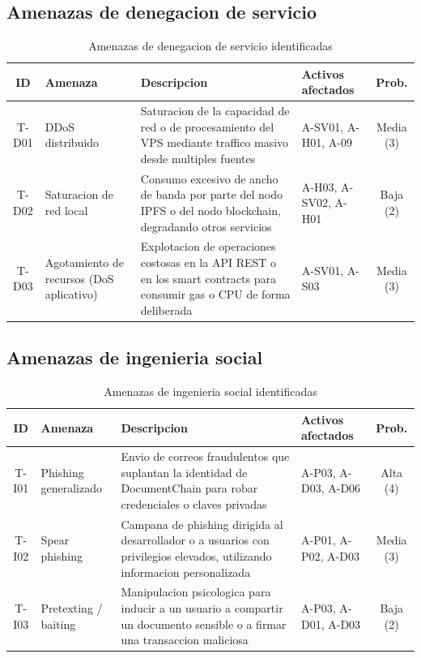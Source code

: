 \documentclass[11pt, a4paper]{article}
\begin{document}
\subsection{Amenazas de denegacion de servicio}

\begin{table}[H]
\centering
\renewcommand{\arraystretch}{1.4}
\small
\begin{tabular}{|c|l|p{4.5cm}|l|c|}
\hline
\textbf{ID} & \textbf{Amenaza} & \textbf{Descripcion} & \textbf{Activos afectados} & \textbf{Prob.} \\
\hline
T-D01 & DDoS distribuido & Saturacion de la capacidad de red o de procesamiento del VPS mediante traffico masivo desde multiples fuentes & A-SV01, A-H01, A-09 & Media (3) \\
\hline
T-D02 & Saturacion de red local & Consumo excesivo de ancho de banda por parte del nodo IPFS o del nodo blockchain, degradando otros servicios & A-H03, A-SV02, A-H01 & Baja (2) \\
\hline
T-D03 & Agotamiento de recursos (DoS aplicativo) & Explotacion de operaciones costosas en la API REST o en los smart contracts para consumir gas o CPU de forma deliberada & A-SV01, A-S03 & Media (3) \\
\hline
\end{tabular}
\caption{Amenazas de denegacion de servicio identificadas}
\label{tab:amenazas-dos}
\end{table}

\subsection{Amenazas de ingenieria social}

\begin{table}[H]
\centering
\renewcommand{\arraystretch}{1.4}
\small
\begin{tabular}{|c|l|p{4.5cm}|l|c|}
\hline
\textbf{ID} & \textbf{Amenaza} & \textbf{Descripcion} & \textbf{Activos afectados} & \textbf{Prob.} \\
\hline
T-I01 & Phishing generalizado & Envio de correos fraudulentos que suplantan la identidad de DocumentChain para robar credenciales o claves privadas & A-P03, A-D03, A-D06 & Alta (4) \\
\hline
T-I02 & Spear phishing & Campana de phishing dirigida al desarrollador o a usuarios con privilegios elevados, utilizando informacion personalizada & A-P01, A-P02, A-D03 & Media (3) \\
\hline
T-I03 & Pretexting / baiting & Manipulacion psicologica para inducir a un usuario a compartir un documento sensible o a firmar una transaccion maliciosa & A-P03, A-D01, A-D03 & Baja (2) \\
\hline
\end{tabular}
\caption{Amenazas de ingenieria social identificadas}
\label{tab:amenazas-ing}
\end{table}
\end{document}
